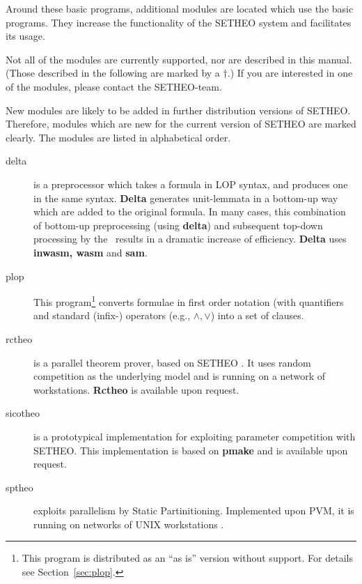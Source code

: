 Around these basic programs, additional modules are located which
use the basic programs. They increase the functionality of the
SETHEO system and facilitates its usage.

Not all of the modules are currently supported, nor are described in
this manual.
(Those described in the following are marked by a $\dagger$.)
If you are interested in one of the modules, please contact the
SETHEO-team.

New modules are likely to be added in further distribution versions
of SETHEO. Therefore, modules which are new for the current version of
SETHEO are marked clearly.
The modules are listed in alphabetical order.

\begin{description}


\item[delta]
is a preprocessor which takes a formula in LOP syntax, and produces
one in the same syntax. {\bf Delta} generates unit-lemmata in a bottom-up
way which are added to the original formula. In many cases, this combination
of bottom-up preprocessing (using {\bf delta}) and subsequent top-down
processing by the \SAM\ results in a dramatic increase of efficiency.
{\bf Delta} uses {\bf inwasm, wasm} and {\bf sam}.

\item[plop]
This program\footnote{This program is distributed as an ``as is'' version
without support. For details see Section~\ref{sec:plop}.} converts
formulae in first order notation (with quantifiers and standard
(infix-) operators (e.g., $\wedge, \vee$) into a set of clauses.
\item[rctheo]
is a parallel theorem prover, based on SETHEO \cite{Ert93}. 
It uses random competition
as the underlying model and is running on a network of workstations.
{\bf Rctheo} is available upon request.

\item[sicotheo]
is a prototypical implementation for exploiting parameter competition
with SETHEO. This implementation is based on {\bf pmake} and is available
upon request.

\item[sptheo]
exploits parallelism by Static Partinitioning. Implemented upon PVM,
it is running on networks of UNIX workstations \cite{Sut95}.


\end{description}
